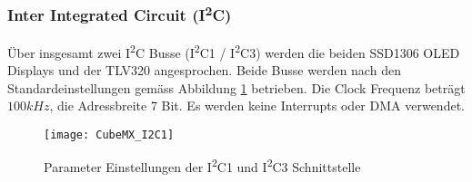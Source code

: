 \subsubsection{Inter Integrated Circuit (I\textsuperscript{2}C)}
\label{sec:CubeMXI2C}

Über insgesamt zwei I\textsuperscript{2}C Busse (I\textsuperscript{2}C1 / I\textsuperscript{2}C3) werden die beiden SSD1306 OLED Displays und der TLV320 angesprochen.
Beide Busse werden nach den Standardeinstellungen gemäss Abbildung \ref{pic:CubeMX_I2C1} betrieben.
Die Clock Frequenz beträgt $100\si{kHz}$, die Adressbreite 7 Bit.
Es werden keine Interrupts oder DMA verwendet.

\begin{figure}[H]
	\centering
	\texttt{[image: CubeMX\_I2C1]}
	\caption{Parameter Einstellungen der I\textsuperscript{2}C1 und  I\textsuperscript{2}C3 Schnittstelle}
	\label{pic:CubeMX_I2C1}
\end{figure}




